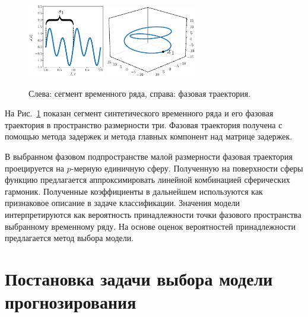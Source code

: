 \documentclass[article,14pt,subf,href,colorlinks=true
]{disser}
\begin{document}
\begin{figure}[h]
\centering
  {\includegraphics[width=0.3\textwidth]{figs/synthetic_example.eps}}
  {\includegraphics[width=0.35\textwidth]{figs/synthetic_trajectory.eps}}\\
\caption{Слева: сегмент временного ряда, справа: фазовая траектория.}
\label{fg:initial_traj}
\end{figure}

На Рис.~\ref{fg:initial_traj} показан сегмент синтетического временного ряда и его фазовая траектория в пространство размерности три.
Фазовая траектория получена с помощью метода задержек и метода главных компонент над матрице задержек.

В выбранном фазовом подпространстве малой размерности фазовая траектория проецируется на $p$-мерную единичную сферу.
Полученную на поверхности сферы функцию предлагается аппроксимировать линейной комбинацией сферических гармоник.
Полученные коэффициенты в дальнейшем используются как признаковое описание в задаче классификации.
Значения модели интерпретируются как вероятность принадлежности точки фазового пространства выбранному временному ряду.
На основе оценок вероятностей принадлежности предлагается метод выбора модели.
\newpage
\section{Постановка задачи выбора модели прогнозирования}
\end{document}
